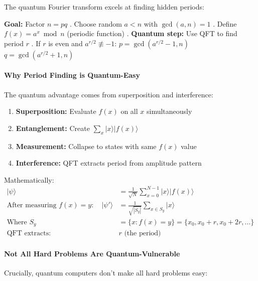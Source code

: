 \documentclass[11pt,a4paper]{article}
\begin{document}
The quantum Fourier transform excels at finding hidden periods:

\begin{algorithm}
\caption{Shor's Algorithm Structure (Simplified)}
\begin{algorithmic}
\State \textbf{Goal:} Factor $n = pq$
\State
{}. Choose random $a < n$ with $\gcd(a,n) = 1$
. Define $f(x) = a^x \bmod n$ (periodic function)
. \textbf{Quantum step:} Use QFT to find period $r$
. If $r$ is even and $a^{r/2} \not\equiv -1$:
\State \quad \quad $p = \gcd(a^{r/2} - 1, n)$
\State \quad \quad $q = \gcd(a^{r/2} + 1, n)$
\end{algorithmic}
\end{algorithm}

\paragraph{Why Period Finding is Quantum-Easy}

The quantum advantage comes from superposition and interference:

\begin{enumerate}
    \item \textbf{Superposition:} Evaluate $f(x)$ on all $x$ simultaneously
    \item \textbf{Entanglement:} Create $\sum_x |x\rangle|f(x)\rangle$
    \item \textbf{Measurement:} Collapse to states with same $f(x)$ value
    \item \textbf{Interference:} QFT extracts period from amplitude pattern
\end{enumerate}

Mathematically:
\begin{align}
|\psi\rangle &= \frac{1}{\sqrt{N}} \sum_{x=0}^{N-1} |x\rangle|f(x)\rangle\\
\text{After measuring } f(x) = y: \quad |\psi'\rangle &= \frac{1}{\sqrt{|S_y|}} \sum_{x \in S_y} |x\rangle\\
\text{Where } S_y &= \{x : f(x) = y\} = \{x_0, x_0+r, x_0+2r, ...\}\\
\text{QFT extracts: } &r \text{ (the period)}
\end{align}

\paragraph{Not All Hard Problems Are Quantum-Vulnerable}

Crucially, quantum computers don't make all hard problems easy:
\end{document}
